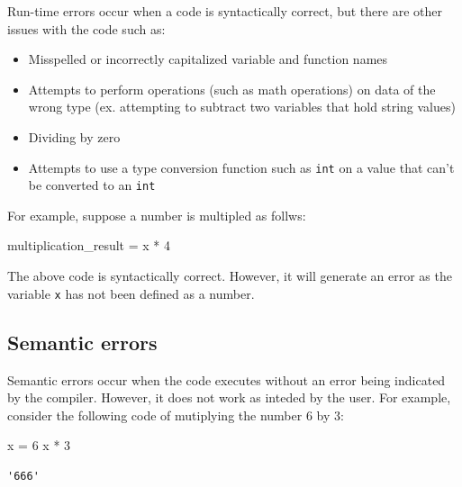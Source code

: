 \documentclass[
  letterpaper,
  DIV=11,
  numbers=noendperiod]{scrreprt}
\newenvironment{Shaded}{\begin{snugshade}}{\end{snugshade}}
\newcommand{\DecValTok}[1]{\textcolor[rgb]{0.68,0.00,0.00}{#1}}
\newcommand{\NormalTok}[1]{\textcolor[rgb]{0.00,0.23,0.31}{#1}}
\newcommand{\OperatorTok}[1]{\textcolor[rgb]{0.37,0.37,0.37}{#1}}
\newcommand{\StringTok}[1]{\textcolor[rgb]{0.13,0.47,0.30}{#1}}
\providecommand{\tightlist}{%
  \setlength{\itemsep}{0pt}\setlength{\parskip}{0pt}}\usepackage{longtable,booktabs,array}
\begin{document}
Run-time errors occur when a code is syntactically correct, but there
are other issues with the code such as:

\begin{itemize}
\tightlist
\item
  Misspelled or incorrectly capitalized variable and function names
\item
  Attempts to perform operations (such as math operations) on data of
  the wrong type (ex. attempting to subtract two variables that hold
  string values)
\item
  Dividing by zero
\item
  Attempts to use a type conversion function such as \texttt{int} on a
  value that can't be converted to an \texttt{int}
\end{itemize}

For example, suppose a number is multipled as follws:

\begin{Shaded}
\begin{Highlighting}[]
\NormalTok{multiplication\_result }\OperatorTok{=}\NormalTok{ x }\OperatorTok{*} \DecValTok{4}
\end{Highlighting}
\end{Shaded}

The above code is syntactically correct. However, it will generate an
error as the variable \texttt{x} has not been defined as a number.

\hypertarget{semantic-errors}{%
\subsection{Semantic errors}\label{semantic-errors}}

Semantic errors occur when the code executes without an error being
indicated by the compiler. However, it does not work as inteded by the
user. For example, consider the following code of mutiplying the number
6 by 3:

\begin{Shaded}
\begin{Highlighting}[]
\NormalTok{x }\OperatorTok{=} \StringTok{\textquotesingle{}6\textquotesingle{}}
\NormalTok{x }\OperatorTok{*} \DecValTok{3}
\end{Highlighting}
\end{Shaded}

\begin{verbatim}
'666'
\end{verbatim}
\end{document}
